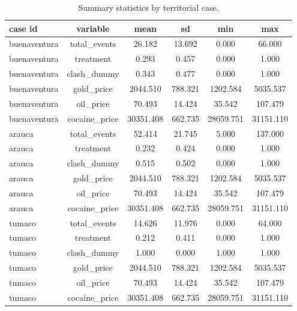\begin{table}[ht]
\centering
\caption{Summary statistics by territorial case.}
\label{tab:summary_by_case}
\begin{tabular}{l c c c c c}
\hline
case id & variable & mean & sd & min & max \\
\hline
buenaventura & total\_events & 26.182 & 13.692 & 0.000 & 66.000 \\
buenaventura & treatment & 0.293 & 0.457 & 0.000 & 1.000 \\
buenaventura & clash\_dummy & 0.343 & 0.477 & 0.000 & 1.000 \\
buenaventura & gold\_price & 2044.510 & 788.321 & 1202.584 & 5035.537 \\
buenaventura & oil\_price & 70.493 & 14.424 & 35.542 & 107.479 \\
buenaventura & cocaine\_price & 30351.408 & 662.735 & 28059.751 & 31151.110 \\
arauca & total\_events & 52.414 & 21.745 & 5.000 & 137.000 \\
arauca & treatment & 0.232 & 0.424 & 0.000 & 1.000 \\
arauca & clash\_dummy & 0.515 & 0.502 & 0.000 & 1.000 \\
arauca & gold\_price & 2044.510 & 788.321 & 1202.584 & 5035.537 \\
arauca & oil\_price & 70.493 & 14.424 & 35.542 & 107.479 \\
arauca & cocaine\_price & 30351.408 & 662.735 & 28059.751 & 31151.110 \\
tumaco & total\_events & 14.626 & 11.976 & 0.000 & 64.000 \\
tumaco & treatment & 0.212 & 0.411 & 0.000 & 1.000 \\
tumaco & clash\_dummy & 1.000 & 0.000 & 1.000 & 1.000 \\
tumaco & gold\_price & 2044.510 & 788.321 & 1202.584 & 5035.537 \\
tumaco & oil\_price & 70.493 & 14.424 & 35.542 & 107.479 \\
tumaco & cocaine\_price & 30351.408 & 662.735 & 28059.751 & 31151.110 \\
\hline
\end{tabular}
\end{table}
